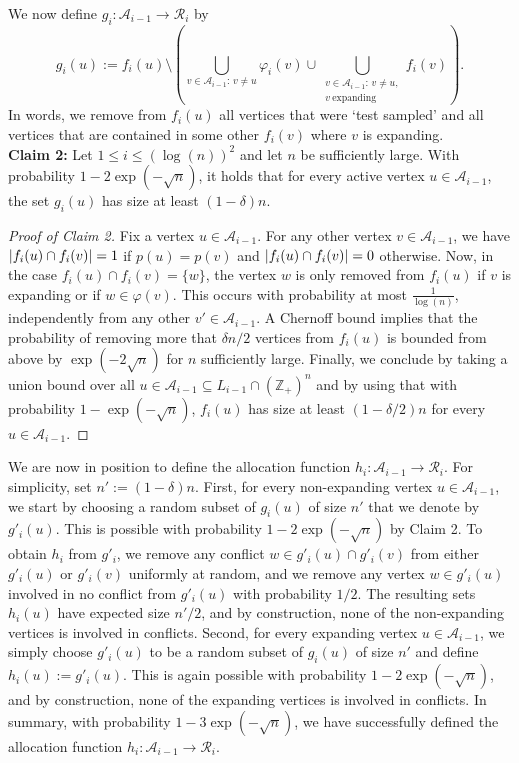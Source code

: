 \documentclass[11pt]{article}
\newcommand{\Z}{\mathbb{Z}}
\newcommand{\A}{\mathcal{A}}
\DeclarePairedDelimiter{\abs}{\lvert}{\rvert}
\theoremstyle{remark}
\begin{document}
We now define $g_i : \A_{i-1} \to \mathcal R_i$ by
\begin{equation}
    g_i(u) := f_i(u) \setminus \left(\bigcup_{v \in \A_{i-1}:\, v\neq u} \varphi_i(v) \cup \bigcup_{\substack{v \in \A_{i-1}:\, v\neq u, \\ v\ \text{expanding}}} f_i(v) \right).
\end{equation}
In words, we remove from $f_i(u)$ all vertices that were `test sampled' and all vertices that are contained in some other $f_i(v)$ where $v$ is expanding.\\

\textbf{Claim 2:} Let $1 \le i \le (\log(n))^2$ and let $n$ be sufficiently large. With probability $1- 2\exp(-\sqrt{n})$, it holds that for every active vertex $u \in \A_{i-1}$, the set $g_i(u)$ has size at least $(1-\delta)n$.
\begin{proof}[Proof of Claim 2]
     Fix a vertex $u \in \A_{i-1}$. For any other vertex $v \in \A_{i-1}$, we have $\abs{f_i(u) \cap f_i(v)} = 1$ if $p(u)=p(v)$ and $\abs{f_i(u) \cap f_i(v)} = 0$ otherwise. Now, in the case  $f_i(u) \cap f_i(v) = \{w\}$, the vertex $w$ is only removed from $f_i(u)$ if $v$ is expanding or if $w \in \varphi(v)$. This occurs with probability at most $\frac{1}{\log(n)}$, independently from any other $v' \in \A_{i-1}$.
     A Chernoff bound implies that the probability of removing more that $\delta n / 2$ vertices from $f_i(u)$ is bounded from above by $\exp(-2\sqrt{n})$ for $n$ sufficiently large. Finally, we conclude by taking a union bound over all $u \in \A_{i-1} \subseteq L_{i-1} \cap (\Z_+)^n$ and by using that with probability $1 - \exp(-\sqrt{n})$, $f_i(u)$ has size at least $(1 - \delta/2)n$ for every $u\in \A_{i-1}$.
\end{proof}

We are now in position to define the allocation function $h_i : \A_{i-1} \to \mathcal R_i$. For simplicity, set $n' := (1-\delta)n$. 
First, for every non-expanding vertex $u \in \A_{i-1}$, we start by choosing a random subset of $g_i(u)$ of size $n'$ that we denote by $g'_i(u)$. This is possible with probability $1-2\exp(-\sqrt{n})$ by Claim 2. To obtain $h_i$ from $g'_i$, we remove any conflict $w \in g'_i(u) \cap g'_i(v)$ from either $g'_i(u)$ or $g'_i(v)$ uniformly at random, and we remove any vertex $w \in g'_i(u)$ involved in no conflict from  $g'_i(u)$ with probability $1/2$. The resulting sets $h_i(u)$ have expected size $n'/2$, and by construction, none of the non-expanding vertices is involved in conflicts. 
Second, for every expanding vertex $u \in \A_{i-1}$, we simply choose $g'_i(u)$ to be a random subset of $g_i(u)$ of size $n'$ and define $h_i(u) := g'_i(u)$. This is again possible with probability $1-2\exp(-\sqrt{n})$, and by construction, none of the expanding vertices is involved in conflicts. 
In summary, with probability $1-3\exp(-\sqrt{n})$, we have successfully defined the allocation function $h_i : \A_{i-1} \to \mathcal R_i$.
\end{document}

